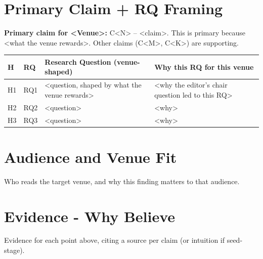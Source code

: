 \documentclass[11pt]{article}
\begin{document}
\section*{Primary Claim + RQ Framing}
\textbf{Primary claim for <Venue>:} C<N> -- <claim>. This is primary because <what the venue rewards>.
%
Other claims (C<M>, C<K>) are supporting.

\bigskip

\begin{small}
\begin{tabularx}{\textwidth}{@{}p{}p{}X p{}@{}}
\toprule
H & RQ & Research Question (venue-shaped) & Why this RQ for this venue \\
\midrule
H1 & RQ1 & <question, shaped by what the venue rewards> & <why the editor's chair question led to this RQ> \\
H2 & RQ2 & <question> & <why> \\
H3 & RQ3 & <question> & <why> \\
\bottomrule
\end{tabularx}
\end{small}

\section*{Audience and Venue Fit}
Who reads the target venue, and why this finding matters to that audience.

\section*{Evidence - Why Believe}
Evidence for each point above, citing a source per claim (or intuition if seed-stage).
\end{document}
